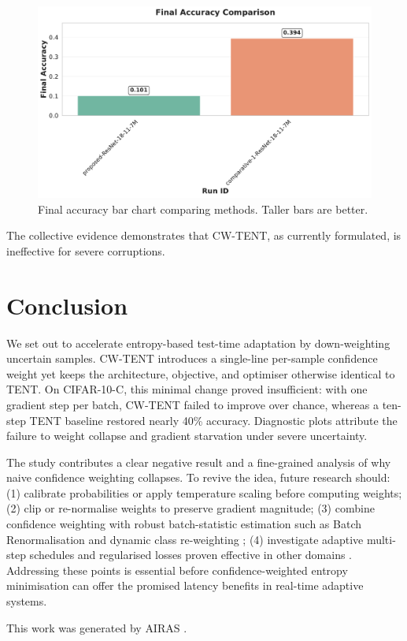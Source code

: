 \documentclass{article} %
\begin{document}
\begin{figure}[H]
  \centering
  \includegraphics[width=0.7\linewidth]{ images/final_accuracy_comparison.pdf }
  \caption{Final accuracy bar chart comparing methods. Taller bars are better.}
\end{figure}

The collective evidence demonstrates that CW-TENT, as currently formulated, is ineffective for severe corruptions.

\section{Conclusion}
\label{sec:conclusion}
We set out to accelerate entropy-based test-time adaptation by down-weighting uncertain samples. CW-TENT introduces a single-line per-sample confidence weight yet keeps the architecture, objective, and optimiser otherwise identical to TENT. On CIFAR-10-C, this minimal change proved insufficient: with one gradient step per batch, CW-TENT failed to improve over chance, whereas a ten-step TENT baseline restored nearly 40\% accuracy. Diagnostic plots attribute the failure to weight collapse and gradient starvation under severe uncertainty.

The study contributes a clear negative result and a fine-grained analysis of why naive confidence weighting collapses. To revive the idea, future research should: (1) calibrate probabilities or apply temperature scaling before computing weights; (2) clip or re-normalise weights to preserve gradient magnitude; (3) combine confidence weighting with robust batch-statistic estimation such as Batch Renormalisation and dynamic class re-weighting \cite{zhao-2023-delta}; (4) investigate adaptive multi-step schedules and regularised losses proven effective in other domains \cite{author-year-test}. Addressing these points is essential before confidence-weighted entropy minimisation can offer the promised latency benefits in real-time adaptive systems.

This work was generated by \textsc{AIRAS} \citep{airas2025}.



\end{document}
